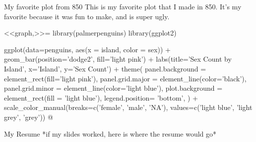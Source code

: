 \documentclass{beamer}
\begin{document}
\begin{frame}{My favorite plot from 850}
This is my favorite plot that I made in 850. It's my favorite because it was fun to make, and is super ugly.

<<graph,>>=
library(palmerpenguins)
library(ggplot2)

ggplot(data=penguins, aes(x = island, color = sex)) +
  geom_bar(position='dodge2', fill='light pink') + labs(title='Sex Count by Island', x='Island', y='Sex Count') + theme(
    panel.background = element_rect(fill='light pink'),
    panel.grid.major = element_line(color='black'),
    panel.grid.minor = element_line(color='light blue'),
    plot.background = element_rect(fill = 'light blue'),
    legend.position= 'bottom',
  ) + scale_color_manual(breaks=c('female', 'male', 'NA'), values=c('light blue', 'light grey', 'grey'))
@
\end{frame}

\begin{frame}{My Resume}
*if my slides worked, here is where the resume would go*
\end{frame}
\end{document}
